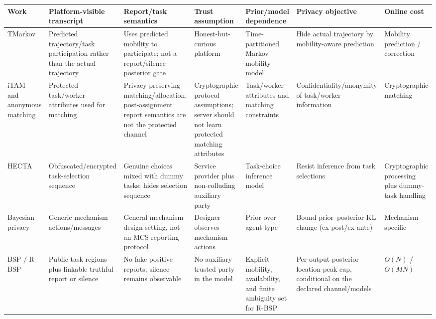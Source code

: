 \begin{tabular}{p{1.6cm}p{2.35cm}p{2.1cm}p{2.05cm}p{2.35cm}p{2.15cm}p{1.35cm}}
\toprule
Work & Platform-visible transcript & Report/task semantics & Trust assumption & Prior/model dependence & Privacy objective & Online cost \\
\midrule
TMarkov~\cite{tmarkov} & Predicted trajectory/task participation rather than the actual trajectory & Uses predicted mobility to participate; not a report/silence posterior gate & Honest-but-curious platform & Time-partitioned Markov mobility model & Hide actual trajectory by mobility-aware prediction & Mobility prediction / correction \\
iTAM~\cite{itam2021} and anonymous matching~\cite{shutask2018} & Protected task/worker attributes used for matching & Privacy-preserving matching/allocation; post-assignment report semantics are not the protected channel & Cryptographic protocol assumptions; server should not learn protected matching attributes & Task/worker attributes and matching constraints & Confidentiality/anonymity of task/worker information & Cryptographic matching \\
HECTA~\cite{inference2026} & Obfuscated/encrypted task-selection sequence & Genuine choices mixed with dummy tasks; hides selection sequence & Service provider plus non-colluding auxiliary party & Task-choice inference model & Resist inference from task selections & Cryptographic processing plus dummy-task handling \\
Bayesian privacy~\cite{bayesian} & Generic mechanism actions/messages & General mechanism-design setting, not an MCS reporting protocol & Designer observes mechanism actions & Prior over agent type & Bound prior--posterior KL change (ex post/ex ante) & Mechanism-specific \\
BSP / R-BSP & Public task regions plus linkable truthful report or silence & No fake positive reports; silence remains observable & No auxiliary trusted party in the model & Explicit mobility, availability, and finite ambiguity set for R-BSP & Per-output posterior location-peak cap, conditional on the declared channel/models & $O(N)$ / $O(MN)$ \\
\bottomrule
\end{tabular}
